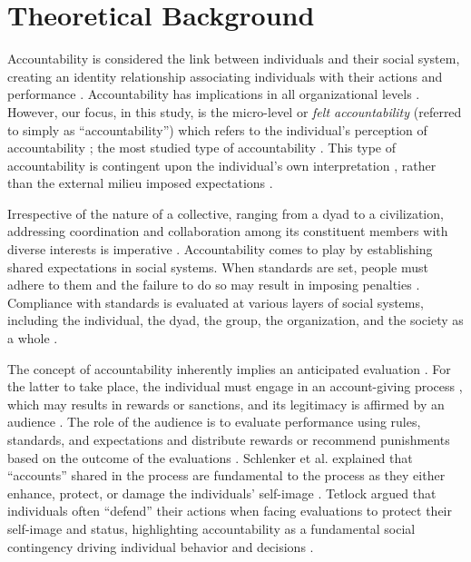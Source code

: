 \section{Theoretical Background}\label{sec:theory}

\noindent Accountability is considered the link between individuals and their social system, creating an identity relationship associating individuals with their actions and performance \citep{tetlock1992impact,mero2007accountability}. Accountability has implications in all organizational levels \citep{frink1998toward}. However, our focus, in this study, is the micro-level or \emph{felt accountability} (referred to simply as ``accountability'') which refers to the individual's perception of accountability \citep{frink1998toward}; the most studied type of accountability \citep{hall2017accountability}. This type of accountability is contingent upon the individual's own interpretation \citep{frink1998toward}, rather than the external milieu imposed expectations \citep{folger2001fairness}.

Irrespective of the nature of a collective, ranging from a dyad to a civilization, addressing coordination and collaboration among its constituent members with diverse interests is imperative \citep{schlenker1994triangle}. Accountability comes to play by establishing shared expectations in social systems. When standards are set, people must adhere to them and the failure to do so may result in imposing penalties \citep{schlenker1994triangle,frink1998toward}. Compliance with standards is evaluated at various layers of social systems, including the individual, the dyad, the group, the organization, and the society as a whole \citep{gelfand2004culture,frink1998toward}.

The concept of accountability inherently implies an anticipated evaluation \citep{hall2017accountability}. For the latter to take place, the individual must engage in an account-giving process \citep{frink2008meso}, which may results in rewards or sanctions, and its legitimacy is affirmed by an audience \citep{hall2017accountability}. The role of the audience is to evaluate performance using rules, standards, and expectations and distribute rewards or recommend punishments based on the outcome of the evaluations \citep{hall2017accountability}. Schlenker et al. explained that ``accounts'' shared in the process are fundamental to the process as they either enhance, protect, or damage the individuals' self-image \citep{schlenker1994triangle}. Tetlock argued that individuals often ``defend'' their actions when facing evaluations to protect their self-image and status, highlighting accountability as a fundamental social contingency driving individual behavior and decisions \citep{tetlock1992impact}.

